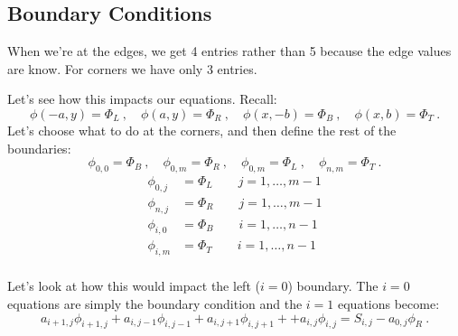 \documentclass[12pt]{article}
\begin{document}
\subsection{Boundary Conditions}

When we're at the edges, we get 4 entries rather than 5 because the edge values are know. For corners we have only 3 entries. 

Let's see how this impacts our equations. Recall:
%
\[\phi(-a,y) = \Phi_L\:, \quad \phi(a,y) = \Phi_R\:, \quad \phi(x,-b) = \Phi_B\:, \quad \phi(x,b) = \Phi_T\:.\]
%
Let's choose what to do at the corners, and then define the rest of the boundaries:
\[\phi_{0,0} = \Phi_B\:, \quad \phi_{0,m} = \Phi_R\:, \quad \phi_{0,m} = \Phi_L\:, \quad \phi_{n,m} = \Phi_T\:.\]
%
\begin{align}
\phi_{0,j} &= \Phi_L \qquad j=1,\dots,m-1 \nonumber \\
\phi_{n,j} &= \Phi_R \qquad j=1,\dots,m-1 \nonumber \\
\phi_{i,0} &= \Phi_B \qquad i=1,\dots,n-1 \nonumber \\
\phi_{i,m} &= \Phi_T \qquad i=1,\dots,n-1 \nonumber \\
\end{align}

Let's look at how this would impact the left ($i=0$) boundary. The $i=0$ equations are simply the boundary condition and the $i=1$ equations become:
\[a_{i+1,j}\phi_{i+1,j} + a_{i,j-1}\phi_{i,j-1} + a_{i,j+1}\phi_{i,j+1} + + a_{i,j}\phi_{i,j} = S_{i,j} - a_{0,j}\phi_R \:.\]






%
% 
\end{document}
